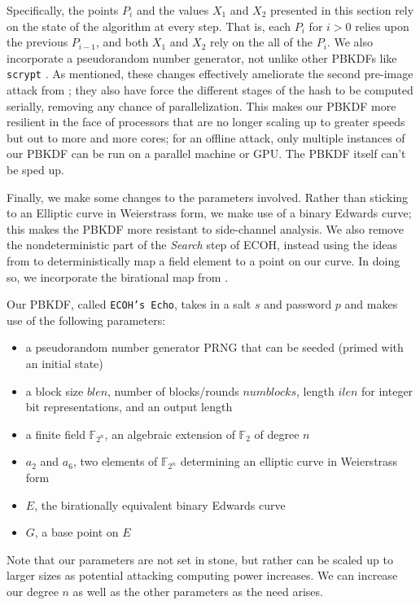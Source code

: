 Specifically, the points $P_i$ and the values $X_1$ and $X_2$ presented in this
    section rely on the state of the algorithm at every step.
That is, each $P_i$ for $i > 0$ relies upon the previous $P_{i-1}$, and both
    $X_1$ and $X_2$ rely on the all of the $P_i$.
We also incorporate a pseudorandom number generator, not unlike other PBKDFs
    like \texttt{scrypt} \cite{percival2009stronger}.
As mentioned, these changes effectively ameliorate the second pre-image attack
    from \cite{cryptoeprint:2009:168}; they also have force the different
    stages of the hash to be computed serially, removing any chance of
    parallelization.
This makes our PBKDF more resilient in the face of processors that are no
    longer scaling up to greater speeds but out to more and more cores; for an
    offline attack, only multiple instances of our PBKDF can be run on a
    parallel machine or GPU.
The PBKDF itself can't be sped up.

Finally, we make some changes to the parameters involved.
Rather than sticking to an Elliptic curve in Weierstrass form, we make use of
    a binary Edwards curve; this makes the PBKDF more resistant to side-channel
    analysis.
We also remove the nondeterministic part of the \textit{Search} step of ECOH,
    instead using the ideas from \cite{icart2009hash} to deterministically map
    a field element to a point on our curve.
In doing so, we incorporate the birational map from \cite{moloneyefficient}.

Our PBKDF, called \texttt{ECOH's Echo}, takes in a salt $s$ and password $p$
    and makes use of the following parameters:
\begin{itemize}
\item   a pseudorandom number generator PRNG that can be seeded (primed with an
initial state)
\item   a block size $blen$, number of blocks/rounds $numblocks$, length $ilen$
    for integer bit representations, and an output length
\item   a finite field $\mathbb{F}_{2^n}$, an algebraic extension of
    $\mathbb{F}_2$ of degree $n$
\item   $a_2$ and $a_6$, two elements of $\mathbb{F}_{2^n}$ determining an
    elliptic curve in Weierstrass form
\item   $E$, the birationally equivalent binary Edwards curve
\item   $G$, a base point on $E$
\end{itemize}
Note that our parameters are not set in stone, but rather can be scaled up to
    larger sizes as potential attacking computing power increases.
We can increase our degree $n$ as well as the other parameters as the need
    arises.

